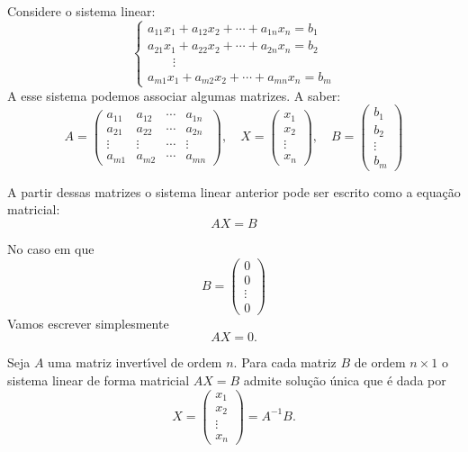Considere o sistema linear: 
\begin{equation}
\begin{cases}
        a_{11}x_1 + a_{12}x_2 + \cdots + a_{1n}x_n = b_1\\
        a_{21}x_1 + a_{22}x_2 + \cdots + a_{2n}x_n = b_2\\
        \qquad \vdots\\
        a_{m1}x_1 + a_{m2}x_2 + \cdots + a_{mn}x_n = b_m
    \end{cases}
\end{equation}
A esse sistema podemos associar algumas matrizes. A saber:
\[
    A = \begin{pmatrix}
        a_{11} & a_{12} & \cdots & a_{1n}\\
        a_{21} & a_{22} & \cdots & a_{2n}\\
        \vdots & \vdots & \cdots & \vdots\\
        a_{m1} & a_{m2} & \cdots & a_{mn}
    \end{pmatrix}, \quad
    X = \begin{pmatrix}
        x_1\\
        x_2\\
        \vdots\\
        x_n
    \end{pmatrix},\quad 
    B = \begin{pmatrix}
        b_1\\
        b_2\\
        \vdots\\
        b_m
    \end{pmatrix}
\]

A partir dessas matrizes o sistema linear anterior pode ser escrito como a equa\c{c}\~ao matricial:
\[
    AX = B
\]

No caso em que
\[
    B = \begin{pmatrix}
        0\\0\\\vdots\\0
    \end{pmatrix}
\]
Vamos escrever simplesmente
\[
    AX = 0.
\]

\begin{teorema}
    Seja $A$ uma matriz invert{\'\i}vel de ordem $n$. Para cada matriz $B$ de ordem $n\times 1$ o sistema linear de forma matricial
    $AX = B$ admite solu\c{c}\~ao \'unica que \'e dada por
    \[
        X = \begin{pmatrix}
            x_1 \\ x_2 \\ \vdots \\ x_n
        \end{pmatrix} = A^{-1}B.
    \]
\end{teorema}

